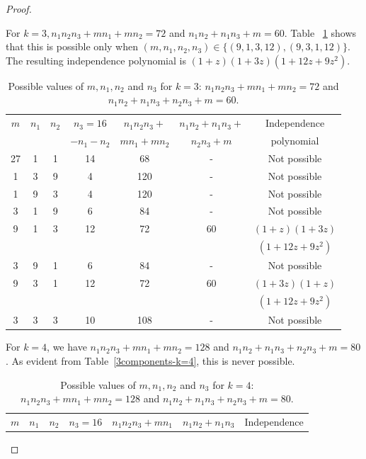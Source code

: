 \documentclass[12pt,a4paper]{article}
\theoremstyle{plain}
\numberwithin{equation}{section}
\begin{document}
\begin{proof}
\begin{enumerate}
For $k=3, n_1 n_2 n_3+mn_1 +mn_2 =72$ and $n_1n_2 + n_1n_3 + m = 60$. Table ~\ref{3components-k=3} shows that this is possible only  when $(m,n_1,n_2,n_3) \in \{(9,1,3,12), (9,3,1,12) \}$. The resulting independence polynomial is $(1+z)(1+3z)(1+12z +9z^2).$
\begin{table}[h!]
\centering
    \caption{Possible values of $m, n_1, n_2$ and $n_3$ for $k=3$: $n_1n_2n_3 +mn_1 +mn_2=72 $ and $n_1n_2 + n_1n_3 + n_2n_3 + m =60$.}
    \begin{tabular}{|c|c|c|c|c|c|c|}
    \hline
      $m$ & $n_1$ & $n_2$ & $n_3=16$ & $n_1n_2n_3 + $ & $n_1n_2 + n_1n_3 + $ & Independence \\
          &      &        & $-n_1 -n_2$   &   $ mn_1 +mn_2$  & $ n_2n_3 + m$  &  polynomial \\
      \hline
      27 & 1 & 1 & 14 & 68 & - & Not possible\\
      \hline
      1 & 3 & 9 & 4  & 120 & - & Not possible\\
         \hline
       1 & 9 & 3 & 4  & 120 & - & Not possible\\
          \hline
       3 & 1 & 9 & 6 & 84 & - & Not possible\\
          \hline
       9 & 1 & 3 & 12 & 72 & 60 & $(1+z)(1+3z)$\\
         &   &    &   &    &    & $(1+12z+9z^2)$\\ 
            \hline
       3 & 9 & 1 & 6 & 84 & - & Not possible\\
          \hline
       9 & 3 & 1 & 12 & 72 & 60 & $(1+3z)(1+z) $\\
             &   &    &   &    &    & $(1+12z+9z^2)$\\ 
                \hline
       3 & 3 & 3 & 10 & 108 & - & Not possible\\
       \hline
    \end{tabular}
    \label{3components-k=3}
\end{table}
  For $k = 4 $, we have $n_1 n_2 n_3 +mn_1 +mn_2 =128$ and $n_1n_2 + n_1 n_3+ n_2n_3 + m=80$. As evident from Table~\ref{3components-k=4}, this is never possible. 
  \begin{table}[h!]
\centering
    \caption{Possible values of $m, n_1, n_2$ and $n_3$ for $k=4$: $n_1 n_2 n_3 +mn_1 +mn_2 =128$ and $n_1n_2 + n_1 n_3+ n_2n_3 + m=80$.}
    \begin{tabular}{|c|c|c|c|c|c|c|}
    \hline
      $m$ & $n_1$ & $n_2$ & $n_3 =16$ & $n_1n_2n_3 + mn_1 $ & $n_1n_2 + n_1n_3 $ &  Independence \\

\end{tabular}
\end{table}
\end{enumerate}
\end{proof}
\end{document}
